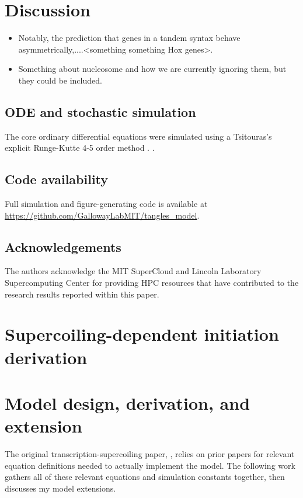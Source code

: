 \documentclass[11pt]{article}
\begin{document}
\FloatBarrier
\section{Discussion}

\begin{itemize}
    \item Notably, the prediction that genes in a tandem syntax behave asymmetrically,....<something something Hox genes>.
    \item Something about nucleosome and how we are currently ignoring them, but they could be included.
\end{itemize}

\subsection{ODE and stochastic simulation}
The core ordinary differential equations were simulated using a Tsitouras's explicit Runge-Kutte 4-5 order method \parencite{tsitourasRungeKuttaPairs2011}.
\parencite{rackauckasDifferentialEquationsJlPerformant2017}.

\subsection{Code availability}
Full simulation and figure-generating code is available at \url{https://github.com/GallowayLabMIT/tangles_model}.

\subsection{Acknowledgements}
The authors acknowledge the MIT SuperCloud and Lincoln Laboratory Supercomputing Center \parencite{reutherInteractiveSupercomputing402018} for providing HPC resources that have contributed to the research results reported within this paper.

\printbibliography

\clearpage
\appendix
\renewcommand{\appendixpagename}{Supplemental information}
\renewcommand{\thefigure}{S\arabic{figure}}
\setcounter{figure}{0}
\appendixpage
\section{Supercoiling-dependent initiation derivation} \label{sec:sc_initation_derivation}


\section{Model design, derivation, and extension}
\label{sec:appendix:model}
The original transcription-supercoiling paper, \cite{sevierPropertiesGeneExpression2018}, relies on prior papers for relevant equation definitions needed to actually implement the model. The following work gathers all of these relevant equations and simulation constants together, then discusses my model extensions.
\end{document}
